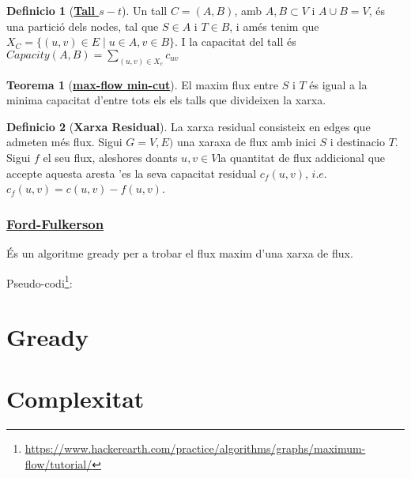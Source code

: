 \documentclass[12pt]{article}
\theoremstyle{definition}
\newtheorem{definicio}{Definicio}
\theoremstyle{definition}
\theoremstyle{definition}
\theoremstyle{definition}
\theoremstyle{definition}
\theoremstyle{definition}
\newtheorem{teo}{Teorema}
\theoremstyle{definition}
\begin{document}
\begin{definicio}[\href{https://en.wikipedia.org/wiki/Cut_(graph_theory)}{\color{blue}\textbf{Tall $s-t$}}]
Un tall $C=(A,B)$, amb $A,B\subset V$ i $A\cup B=V$, és una partició dels nodes, tal que $S\in A$ i $T\in B$, i amés tenim que $X_C=\{(u,v)\in E\mid u\in A,v\in B\}$.
I la capacitat del tall és $Capacity(A,B)=\sum_{(u,v)\in X_c} c_{uv}$
\end{definicio}

\begin{teo}[\href{https://en.wikipedia.org/wiki/Max-flow_min-cut_theorem}{\color{blue}\textbf{max-flow min-cut}}]
El maxim flux entre $S$ i $T$ és igual a la minima capacitat d'entre tots els els talls que divideixen la xarxa.  
\end{teo}

\begin{definicio}[\textbf{Xarxa Residual}]
La xarxa residual consisteix en edges que admeten més flux. Sigui $G=V,E)$ una xaraxa de flux amb inici $S$ i destinacio $T$. Sigui $f$ el seu flux, aleshores doants $u,v\in V$la quantitat de flux addicional que accepte aquesta aresta 'es la seva capacitat residual $c_f(u,v)$, $i.e.$ $c_f(u,v)=c(u,v)-f(u,v)$. 
\end{definicio}

\subsubsection{\href{https://en.wikipedia.org/wiki/Ford–Fulkerson_algorithm}{\color{blue}Ford-Fulkerson}}
És un algoritme gready per a trobar el flux maxim d'una xarxa de flux.

Pseudo-codi\footnote{\url{https://www.hackerearth.com/practice/algorithms/graphs/maximum-flow/tutorial/}}:



\section{Gready}

\section{Complexitat}
\end{document}
